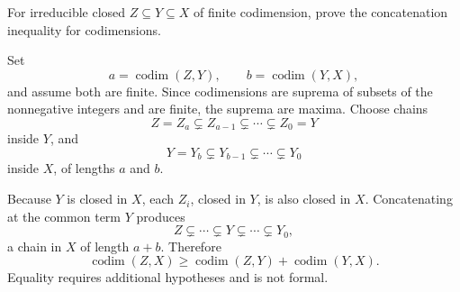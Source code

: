 \begin{problem}\label{prob:vi31-16}
For irreducible closed \(Z\subseteq Y\subseteq X\) of finite codimension, prove the concatenation inequality for codimensions.
\end{problem}

\ifdefined\FullProblemDossiers
\begin{solution}
Set
\[
a=\operatorname{codim}(Z,Y),
\qquad
b=\operatorname{codim}(Y,X),
\]
and assume both are finite. Since codimensions are suprema of subsets of the nonnegative integers and are finite,
the suprema are maxima. Choose chains
\[
Z=Z_a\subsetneq Z_{a-1}\subsetneq\cdots\subsetneq Z_0=Y
\]
inside \(Y\), and
\[
Y=Y_b\subsetneq Y_{b-1}\subsetneq\cdots\subsetneq Y_0
\]
inside \(X\), of lengths \(a\) and \(b\).

Because \(Y\) is closed in \(X\), each \(Z_i\), closed in \(Y\), is also closed in \(X\). Concatenating at the
common term \(Y\) produces
\[
Z\subsetneq\cdots\subsetneq Y\subsetneq\cdots\subsetneq Y_0,
\]
a chain in \(X\) of length \(a+b\). Therefore
\[
\boxed{
\operatorname{codim}(Z,X)
\ge
\operatorname{codim}(Z,Y)+\operatorname{codim}(Y,X).
}
\]
Equality requires additional hypotheses and is not formal.
\end{solution}
\fi
